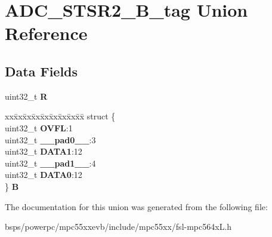 \hypertarget{unionADC__STSR2__32B__tag}{}\section{A\+D\+C\+\_\+\+S\+T\+S\+R2\+\_\+B\+\_\+tag Union Reference}
\label{unionADC__STSR2__32B__tag}
\subsection*{Data Fields}
\begin{DoxyCompactItemize}
\item 
\mbox{\label{unionADC__STSR2__32B__tag_a2426f7295706a1cccab4554f88121d91}} 
uint32\+\_\+t {\bfseries R}
\item 
\mbox{\label{unionADC__STSR2__32B__tag_a15a8871e8a221895d41c8ab54073663f}} 
\begin{tabbing}
xx\=xx\=xx\=xx\=xx\=xx\=xx\=xx\=xx\=\kill
struct \{\\
\>uint32\_t {\bfseries OVFL}:1\\
\>uint32\_t {\bfseries \_\_pad0\_\_}:3\\
\>uint32\_t {\bfseries DATA1}:12\\
\>uint32\_t {\bfseries \_\_pad1\_\_}:4\\
\>uint32\_t {\bfseries DATA0}:12\\
\} {\bfseries B}\\

\end{tabbing}\end{DoxyCompactItemize}


The documentation for this union was generated from the following file\+:\begin{DoxyCompactItemize}
\item 
bsps/powerpc/mpc55xxevb/include/mpc55xx/fsl-\/mpc564x\+L.\+h\end{DoxyCompactItemize}
